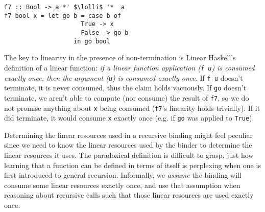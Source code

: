 \documentclass[acmsmall,review]{acmart}
\newcommand{\incode}[1]{\lstinline{#1}}
\newcommand{\lolli}{\multimap}
\begin{document}
\begin{notyet}
\begin{lstlisting}
f7 :: Bool -> a *' $\lolli$ '*  a
f7 bool x = let go b = case b of
                     True -> x
                     False -> go b
                   in go bool
          \end{lstlisting}
        \end{notyet}

The key to linearity in the presence of non-termination is Linear Haskell's
definition of a linear function: \emph{if a linear function application (\incode{f u}) is
consumed exactly once, then the argument (\incode{u}) is consumed exactly once}.
If \incode{f u} doesn't terminate, it is never consumed, thus the claim holds
vacuously.
%
If \incode{go} doesn't terminate, we aren't able to compute (nor consume) the result
of \incode{f7}, so we do not promise anything about \incode{x} being consumed (\incode{f7}'s
linearity holds trivially). If it did terminate, it would consume \incode{x} exactly
once (e.g. if \incode{go} was applied to \incode{True}).

Determining the linear resources used in a recursive binding might feel
peculiar since we need to know the linear resources used by the binder to determine the linear resources it uses.
%
The paradoxical definition is difficult to grasp, just how learning that a
function can be defined in terms of itself is perplexing when one is first
introduced to general recursion.
%
Informally, we \emph{assume} the binding will consume some linear resources
exactly once, and use that assumption when reasoning about recursive calls such
that those linear resources are used exactly once.

\end{document}
